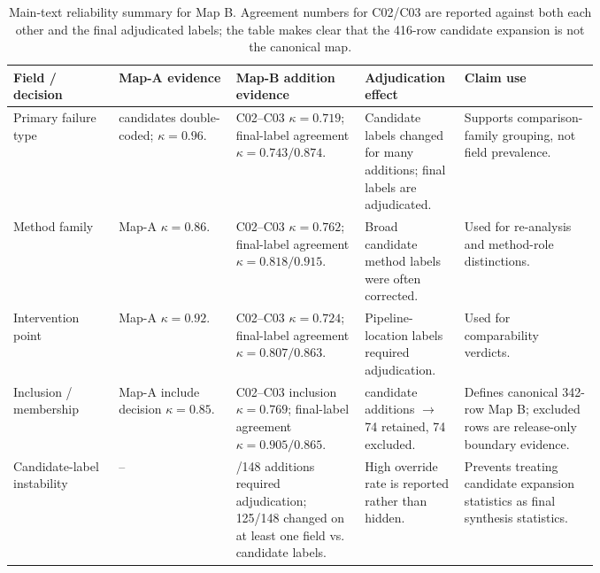 \documentclass[11pt]{article}
\begin{document}
\begin{table}[t]
\centering
\scriptsize
\renewcommand{\arraystretch}{0.9}
\begin{tabularx}{\linewidth}{>{\raggedright\arraybackslash}p{0.18\linewidth}>{\raggedright\arraybackslash}p{0.20\linewidth}>{\raggedright\arraybackslash}p{0.22\linewidth}>{\raggedright\arraybackslash}p{0.17\linewidth}X}
\toprule
\textbf{Field / decision} & \textbf{Map-A evidence} & \textbf{Map-B addition evidence} & \textbf{Adjudication effect} & \textbf{Claim use} \\
\midrule
Primary failure type & 274 candidates double-coded; $\kappa=0.96$. & C02--C03 $\kappa=0.719$; final-label agreement $\kappa=0.743/0.874$. & Candidate labels changed for many additions; final labels are adjudicated. & Supports comparison-family grouping, not field prevalence. \\
Method family & Map-A $\kappa=0.86$. & C02--C03 $\kappa=0.762$; final-label agreement $\kappa=0.818/0.915$. & Broad candidate method labels were often corrected. & Used for re-analysis and method-role distinctions. \\
Intervention point & Map-A $\kappa=0.92$. & C02--C03 $\kappa=0.724$; final-label agreement $\kappa=0.807/0.863$. & Pipeline-location labels required adjudication. & Used for comparability verdicts. \\
Inclusion / membership & Map-A include decision $\kappa=0.85$. & C02--C03 inclusion $\kappa=0.769$; final-label agreement $\kappa=0.905/0.865$. & 148 candidate additions $\rightarrow$ 74 retained, 74 excluded. & Defines canonical 342-row Map B; excluded rows are release-only boundary evidence. \\
Candidate-label instability & -- & 139/148 additions required adjudication; 125/148 changed on at least one field vs. candidate labels. & High override rate is reported rather than hidden. & Prevents treating candidate expansion statistics as final synthesis statistics. \\
\bottomrule
\end{tabularx}
\caption{Main-text reliability summary for Map B. Agreement numbers for C02/C03 are reported against both each other and the final adjudicated labels; the table makes clear that the 416-row candidate expansion is not the canonical map.}
\label{tab:main-map-b-reliability}
\end{table}


\end{document}
